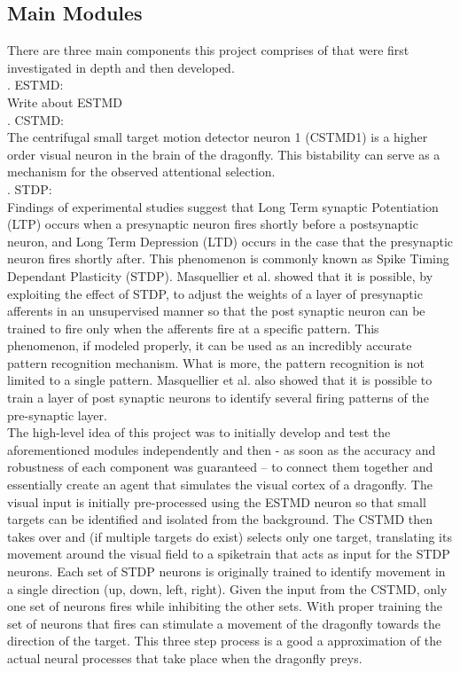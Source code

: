 \documentclass[a4paper,11pt]{article}
\begin{document}
\subsection{Main Modules} 
There are three main components this project comprises  of that were first investigated in depth and then developed.\\

. ESTMD:\\
Write about ESTMD\\

. CSTMD:\\
The centrifugal small target motion detector neuron 1 (CSTMD1) is a higher order visual neuron in the brain of the dragonfly.  This bistability can serve as a mechanism for the observed attentional selection.\\

. STDP:\\
Findings of experimental studies suggest that Long Term synaptic Potentiation (LTP) occurs when a presynaptic neuron fires shortly before a postsynaptic neuron, and Long Term Depression (LTD) occurs in the case that the presynaptic neuron fires shortly after. This phenomenon is commonly known as Spike Timing Dependant Plasticity (STDP)\cite{stdp1}. Masquellier et al. showed that it is possible, by exploiting the effect of STDP, to adjust the weights of a layer of presynaptic afferents in an unsupervised manner so that the post synaptic neuron can be trained to fire only when the afferents fire at a specific pattern. This phenomenon, if modeled properly, it can be used as an incredibly accurate pattern recognition mechanism. What is more, the pattern recognition is not limited to a single pattern. Masquellier et al. also showed that it is possible to train a layer of post synaptic neurons to identify several firing patterns of the pre-synaptic layer\cite{stdp2}.\\ 



The high-level idea of this project was to initially develop and test the aforementioned modules independently and then - as soon as the accuracy and robustness of each component was guaranteed – to connect them together and essentially create an agent that simulates the visual cortex of a dragonfly. The visual input is initially pre-processed using the ESTMD neuron so that small targets can be identified and isolated from the background. The CSTMD then takes over and (if multiple targets do exist) selects only one target, translating its movement around the visual field to a spiketrain that acts as input for the STDP neurons. Each set of STDP neurons is originally trained to identify movement in a single direction (up, down, left, right). Given the input from the CSTMD, only one set of neurons fires while inhibiting the other sets. With proper training the set of neurons that fires can stimulate a movement of the dragonfly towards the direction of the target. This three step process is a good a approximation of the actual neural processes that take place when the dragonfly preys.
\end{document}
